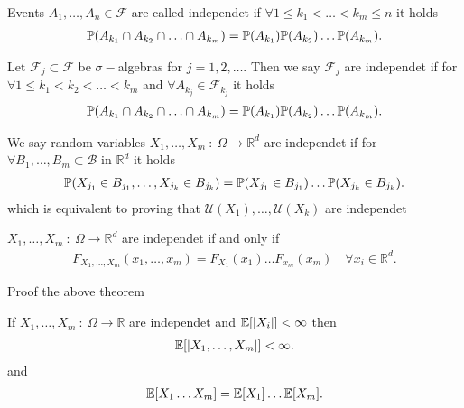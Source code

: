 \begin{definition}
  Events $A_{1},\ldots ,A_{n} \in  \mathcal{F}$ are called independet if $\forall 1 \le k_{1} < \ldots  < k_m \le  n$ it holds 
  \begin{align*}
    \P(A_{k_{1}}\cap A_{k_2} \cap \ldots \cap A_{k_m} )=\P(A_{k_{1}})\P(A_{k_{2}})\ldots \P(A_{k_m})
  .\end{align*}
\end{definition}
\begin{definition}
 Let $\mathcal{F}_j \subset  \mathcal{F}$   be $\sigma-$algebras for $j=1,2,\ldots $. Then we say $\mathcal{F}_j$ are independet if 
 for $\forall 1 \le k_{1}<k_{2}<\ldots <k_m$ and $\forall A_{k_j} \in  \mathcal{F}_{k_j}$ it holds
 \begin{align*}
  \P(A_{k_{1}}\cap A_{k_2} \cap \ldots \cap A_{k_m} )=\P(A_{k_{1}})\P(A_{k_{2}})\ldots \P(A_{k_m})
 .\end{align*}
\end{definition}
\begin{definition}
 We say random variables $X_{1},\ldots ,X_m \ : \ \Omega  \to \mathbb{R}^{d} $  are independet if 
 for $\forall  B_{1},\ldots ,B_{m} \subset  \mathcal{B}$ in $\mathbb{R}^{d} $ it holds 
 \begin{align*}
   \P(X_{j_{1}}\in B_{j_{1}},\ldots, X_{j_k}\in B_{j_k} ) = \P(X_{j_{1}} \in  B_{j_{1}})\ldots \P(X_{j_k} \in  B_{j_k})
 .\end{align*}
 which is equivalent to proving that $\mathcal{U}(X_{1}),\ldots ,\mathcal{U}(X_k)$ are independet
\end{definition}
\begin{theorem}
 $X_{1},\ldots ,X_m \ : \ \Omega  \to \mathbb{R}^{d} $ are independet if and only if 
 \begin{align*}
   F_{X_{1},\ldots ,X_m}(x_{1},\ldots ,x_m) =F_{X_{1}}(x_{1})\ldots F_{x_m}(x_m) \quad \forall  x_i \in \mathbb{R}^{d} 
 .\end{align*}
\end{theorem}
\begin{exercise}
 Proof the above theorem 
\end{exercise}
\begin{theorem}
  If $X_{1},\ldots ,X_m \ : \ \Omega  \to \mathbb{R} $ are independet and $\E[\abs{X_i}] < \infty$ then 
  \begin{align*}
    \E[\abs{X_{1},\ldots ,X_m}]<\infty
  .\end{align*}
  and 
  \begin{align*}
    \E[X_{1}\ldots X_m] = \E[X_{1}]\ldots \E[X_m]
  .\end{align*}
\end{theorem}
